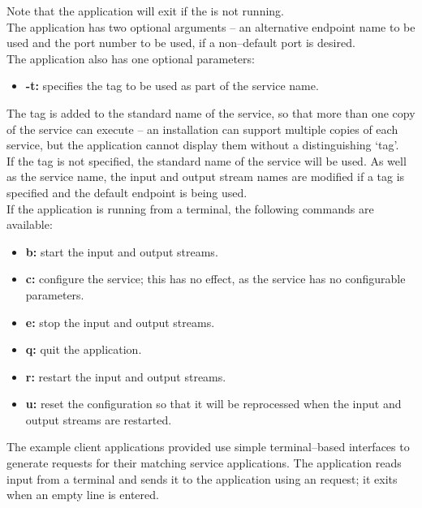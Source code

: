 Note that the application will exit if the
 is not running.\\

The application has two optional arguments -- an alternative endpoint name to be used and
the port number to be used, if a non--default port is desired.\\

The application also has one optional parameters:
\begin{itemize}
\item \textbf{-t:} specifies the tag to be used as part of the service name.
\end{itemize}
The tag is added to the standard name of the service, so that more than one copy of the
service can execute -- an \mplusm{} installation can support multiple copies of each
 service, but the 
application cannot display them without a distinguishing `tag'.\\
If the tag is not specified, the standard name of the service will be used.
As well as the service name, the input and output stream names are modified if a tag is
specified and the default endpoint is being used.\\

If the application is running from a terminal, the following commands are available:
\begin{itemize}
\item \textbf{b:} start the input and output streams. 
\item \textbf{c:} configure the service; this has no effect, as the service has no
configurable parameters. 
\item \textbf{e:} stop the input and output streams. 
\item \textbf{q:} quit the application. 
\item \textbf{r:} restart the input and output streams.
\item \textbf{u:} reset the configuration so that it will be reprocessed when the input
and output streams are restarted. 
\end{itemize}
\secondaryEnd{}
The example client applications provided use simple terminal--based interfaces to
generate requests for their matching service applications.
The  application reads input from a terminal and
sends it to the  application using an
 request; it exits when an empty line is
entered.\\

